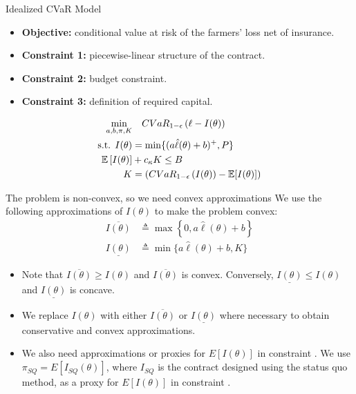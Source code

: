 \documentclass{beamer}
\begin{document}
\begin{frame}{Idealized CVaR Model}
\begin{itemize}
    \item \textbf{Objective:} conditional value at risk of the farmers' loss net of insurance.
    \item  \textbf{Constraint 1:} piecewise-linear structure of the contract. 
    \item \textbf{Constraint 2:} budget constraint.
    \item \textbf{Constraint 3:} definition of required capital.
\end{itemize}
 
\begin{align}
        \min_{a,b,\pi, K}  & \quad CVaR_{1-\epsilon}\left ( \ell - I(\theta) \right ) \notag\\
        \text{s.t.   }I(\theta) &= \min \{ (a\hat{\ell}(\theta) + b)^+,P \} \\
        \mathbb{E}\left [ I(\theta) \right ] &+ c_{\kappa} K \leq B \\
        K &= \left( CVaR_{1-\epsilon}\left ( I(\theta) \right ) - \mathbb{E}[I(\theta)] \right) \label{cons-budget}
    \end{align}
\end{frame}

\begin{frame}{The problem is non-convex, so we need convex approximations}
\label{convex-approx}
We use the following approximations of $I(\theta)$ to make the problem convex: 
\begin{align*}
    \overline{I(\theta)} &\triangleq \max \left \{ 0,a\hat{\ell}(\theta) + b\right \} \\
    \underline{I(\theta)} &\triangleq \min \{ a\hat{\ell}(\theta) + b,K \}
\end{align*}
\begin{itemize}
    \item Note that $\overline{I(\theta)} \geq I(\theta)$ and $\overline{I(\theta)}$ is convex. Conversely, $\underline{I(\theta)} \leq I(\theta)$ and $\underline{I(\theta)}$ is concave. 
    \item We replace $I(\theta)$ with either $\overline{I(\theta)}$ or $\underline{I(\theta)}$ where necessary to obtain conservative and convex approximations. 
    \item We also need approximations or proxies for $E[I(\theta)]$ in constraint . We use $\pi_{SQ} = E[I_{SQ}(\theta)]$, where $I_{SQ}$ is the contract designed using the status quo method, as a proxy for $E[I(\theta)]$ in constraint .
\end{itemize}
\end{frame}
\end{document}
